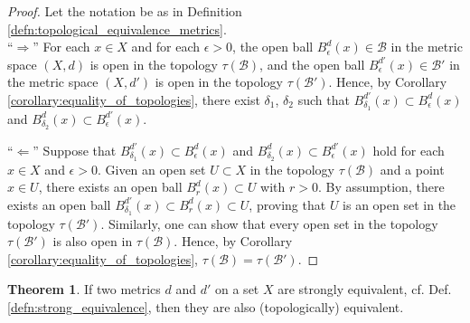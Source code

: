 \documentclass[12pt, a4paper]{article}
\numberwithin{equation}{section}
\theoremstyle{definition}
\theoremstyle{definition}
\newtheorem{theorem}[thm]{Theorem}
\begin{document}
		\begin{proof}
			Let the notation be as in Definition \ref{defn:topological_equivalence_metrics}.
			\\
			
			\enquote{$\Longrightarrow$} For each $x\in X$ and for each $\epsilon > 0$, the open ball $B^{d}_{\epsilon}(x)\in\mathscr B$ in the metric space $(X, d)$ is open in the topology $\tau(\mathscr B)$, and the open ball $B^{d'}_{\epsilon}(x)\in\mathscr B'$ in the metric space $(X, d')$ is open in the topology $\tau(\mathscr B')$. Hence, by Corollary \ref{corollary:equality_of_topologies}, there exist $\delta_1$, $\delta_2$ such that $B^{d'}_{\delta_1}(x) \subset B^{d}_{\epsilon}(x)$ and $B^{d}_{\delta_2}(x) \subset B^{d'}_{\epsilon}(x)$.
			
			\enquote{$\Longleftarrow$} Suppose that $B^{d'}_{\delta_1}(x) \subset B^{d}_{\epsilon}(x)$ and $B^{d}_{\delta_2}(x) \subset B^{d'}_{\epsilon}(x)$ hold for each $x\in X$ and $\epsilon > 0$. Given an open set $U\subset X$ in the topology $\tau(\mathscr B)$ and a point $x\in U$, there exists an open ball $B^{d}_{r}(x) \subset U$ with $r > 0$. By assumption, there exists an open ball $B^{d'}_{\delta_1}(x) \subset B^{d}_{r}(x) \subset U$, proving that $U$ is an open set in the topology $\tau(\mathscr B')$. Similarly, one can show that every open set in the topology $\tau(\mathscr B')$ is also open in $\tau(\mathscr B)$. Hence, by Corollary \ref{corollary:equality_of_topologies}, $\tau(\mathscr B) = \tau(\mathscr B')$.
		\end{proof}
		
		\begin{theorem}
			If two metrics $d$ and $d'$ on a set $X$ are strongly equivalent, cf. Def. \ref{defn:strong_equivalence}, then they are also (topologically) equivalent.
		\end{theorem}
		
\end{document}
